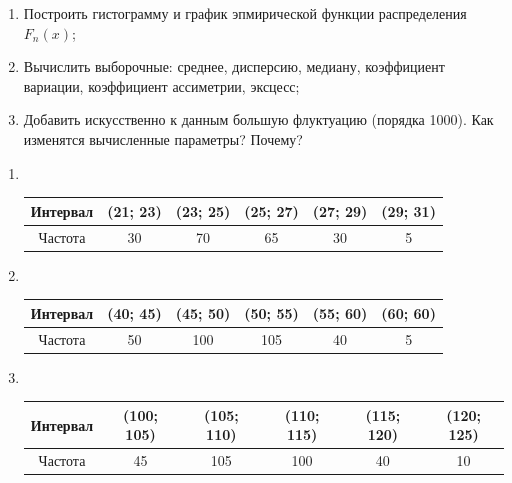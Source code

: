 \documentclass[12pt,a4paper]{article}
\begin{document}
	\begin{enumerate}
		\item Построить гистограмму и график эпмирической функции распределения \( F_n(x) \);
		\item Вычислить выборочные: среднее, дисперсию, медиану, коэффициент вариации, коэффициент ассиметрии, эксцесс;
		\item Добавить искусственно к данным большую флуктуацию (порядка 1000). Как изменятся вычисленные параметры? Почему?
	\end{enumerate}

	\begin{enumerate}
		\item \

		\begin{table}[htbp!]
			\centering
			\begin{tabular}{ |c|c|c|c|c|c| }
				\hline
				Интервал & (21; 23) & (23; 25) & (25; 27) & (27; 29) & (29; 31) \\
				\hline
				Частота & 30 & 70 & 65 & 30 & 5 \\
				\hline
			\end{tabular}
		\end{table}

		\vspace{4em}

		\item \

		\begin{table}[htbp!]
			\centering
			\begin{tabular}{ |c|c|c|c|c|c| }
				\hline
				Интервал & (40; 45) & (45; 50) & (50; 55) & (55; 60) & (60; 60) \\
				\hline
				Частота & 50 & 100 & 105 & 40 & 5 \\
				\hline
			\end{tabular}
		\end{table}

		\vspace{4em}

		\item \

		\begin{table}[htbp!]
			\centering
			\begin{tabular}{ |c|c|c|c|c|c| }
				\hline
				Интервал & (100; 105) & (105; 110) & (110; 115) & (115; 120) & (120; 125) \\
				\hline
				Частота & 45 & 105 & 100 & 40 & 10 \\
				\hline
			\end{tabular}
		\end{table}


\end{enumerate}
\end{document}
